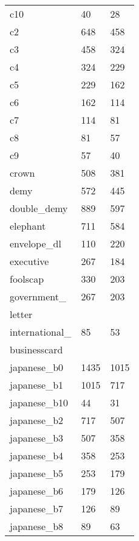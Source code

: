 {\begin{supertabular}{|lll|}
                        c10 &     40 &     28 \\
                         c2 &    648 &    458 \\
                         c3 &    458 &    324 \\
                         c4 &    324 &    229 \\
                         c5 &    229 &    162 \\
                         c6 &    162 &    114 \\
                         c7 &    114 &     81 \\
                         c8 &     81 &     57 \\
                         c9 &     57 &     40 \\
                      crown &    508 &    381 \\
                       demy &    572 &    445 \\
               double\_demy &    889 &    597\\
                   elephant &    711 &    584 \\
               envelope\_dl &    110 &    220\\
                  executive &    267 &    184 \\
                   foolscap &    330 &    203 \\
         government\_       &    267 &    203\\
\hfill               letter &        &       \\
international\_             &     85 &     53\\
\hfill         businesscard &        &       \\
               japanese\_b0 &   1435 &   1015\\
               japanese\_b1 &   1015 &    717\\
              japanese\_b10 &     44 &     31\\
               japanese\_b2 &    717 &    507\\
               japanese\_b3 &    507 &    358\\
               japanese\_b4 &    358 &    253\\
               japanese\_b5 &    253 &    179\\
               japanese\_b6 &    179 &    126\\
               japanese\_b7 &    126 &     89\\
               japanese\_b8 &     89 &     63\\

\end{supertabular}}
